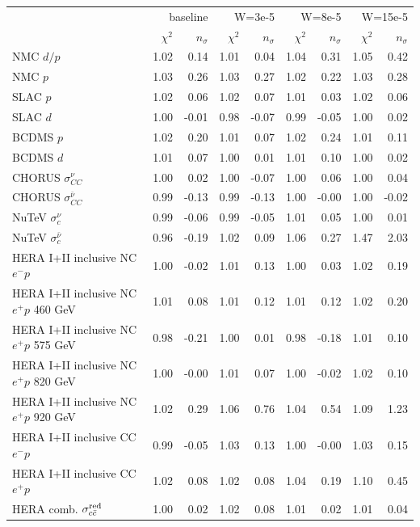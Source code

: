 \documentclass[withindex,glossary]{cam-thesis}
\begin{document}
\begin{table}[H]
        \tiny
        \centering
\begin{tabular}{lrrrrrrrr}
\toprule
 & \multicolumn{2}{r}{baseline} & \multicolumn{2}{r}{W=3e-5} & \multicolumn{2}{r}{W=8e-5} & \multicolumn{2}{r}{W=15e-5} \\
 & $\chi^2$ & $n_\sigma$ & $\chi^2$ & $n_\sigma$ & $\chi^2$ & $n_\sigma$ & $\chi^2$ & $n_\sigma$ \\
\midrule
NMC $d/p$ & 1.02 & 0.14 & 1.01 & 0.04 & 1.04 & 0.31 & 1.05 & 0.42 \\
NMC $p$ & 1.03 & 0.26 & 1.03 & 0.27 & 1.02 & 0.22 & 1.03 & 0.28 \\
SLAC $p$ & 1.02 & 0.06 & 1.02 & 0.07 & 1.01 & 0.03 & 1.02 & 0.06 \\
SLAC $d$ & 1.00 & -0.01 & 0.98 & -0.07 & 0.99 & -0.05 & 1.00 & 0.02 \\
BCDMS $p$ & 1.02 & 0.20 & 1.01 & 0.07 & 1.02 & 0.24 & 1.01 & 0.11 \\
BCDMS $d$ & 1.01 & 0.07 & 1.00 & 0.01 & 1.01 & 0.10 & 1.00 & 0.02 \\
CHORUS $\sigma_{CC}^{\nu}$ & 1.00 & 0.02 & 1.00 & -0.07 & 1.00 & 0.06 & 1.00 & 0.04 \\
CHORUS $\sigma_{CC}^{\bar{\nu}}$ & 0.99 & -0.13 & 0.99 & -0.13 & 1.00 & -0.00 & 1.00 & -0.02 \\
NuTeV $\sigma_{c}^{\nu}$ & 0.99 & -0.06 & 0.99 & -0.05 & 1.01 & 0.05 & 1.00 & 0.01 \\
NuTeV $\sigma_{c}^{\bar{\nu}}$ & 0.96 & -0.19 & 1.02 & 0.09 & 1.06 & 0.27 & 1.47 & 2.03 \\
HERA I+II inclusive NC $e^-p$ & 1.00 & -0.02 & 1.01 & 0.13 & 1.00 & 0.03 & 1.02 & 0.19 \\
HERA I+II inclusive NC $e^+p$ 460 GeV & 1.01 & 0.08 & 1.01 & 0.12 & 1.01 & 0.12 & 1.02 & 0.20 \\
HERA I+II inclusive NC $e^+p$ 575 GeV & 0.98 & -0.21 & 1.00 & 0.01 & 0.98 & -0.18 & 1.01 & 0.10 \\
HERA I+II inclusive NC $e^+p$ 820 GeV & 1.00 & -0.00 & 1.01 & 0.07 & 1.00 & -0.02 & 1.02 & 0.10 \\
HERA I+II inclusive NC $e^+p$ 920 GeV & 1.02 & 0.29 & 1.06 & 0.76 & 1.04 & 0.54 & 1.09 & 1.23 \\
HERA I+II inclusive CC $e^-p$ & 0.99 & -0.05 & 1.03 & 0.13 & 1.00 & -0.00 & 1.03 & 0.15 \\
HERA I+II inclusive CC $e^+p$ & 1.02 & 0.08 & 1.02 & 0.08 & 1.04 & 0.19 & 1.10 & 0.45 \\
HERA comb. $\sigma_{c\bar c}^{\rm red}$ & 1.00 & 0.02 & 1.02 & 0.08 & 1.01 & 0.02 & 1.01 & 0.04 \\

\end{tabular}
\end{table}
\end{document}
